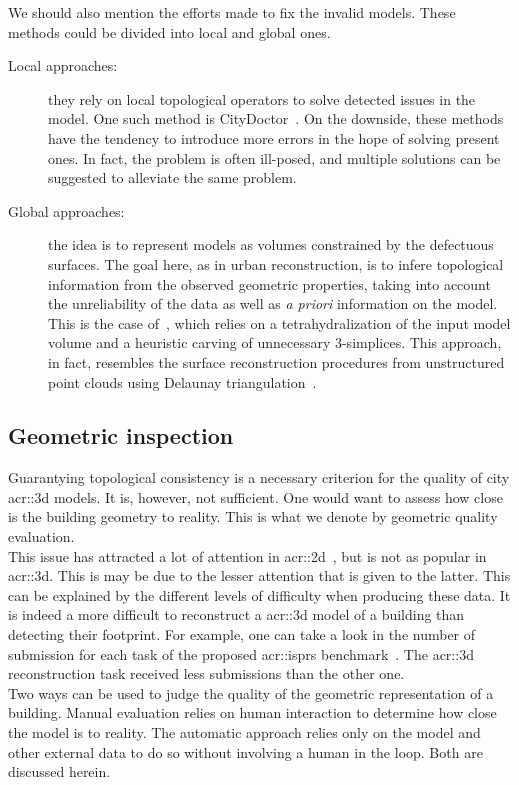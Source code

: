         We should also mention the efforts made to fix the invalid models. 
        These methods could be divided into local and global ones.
        \begin{description}
            \item[Local approaches:] they rely on local topological operators to solve detected issues in the model.
                    One such method is CityDoctor~\parencite{alam2014towards}.
                    On the downside, these methods have the tendency to introduce more errors in the hope of solving present ones.
                    In fact, the problem is often ill-posed, and multiple solutions can be suggested to alleviate the same problem.
            \item[Global approaches:] the idea is to represent models as volumes constrained by the defectuous surfaces.
                    The goal here, as in urban reconstruction, is to infere topological information from the observed geometric properties, taking into account the unreliability of the data as well as \textit{a priori} information on the model.
                    This is the case of~\textcite{zhao2013automatic}, which relies on a tetrahydralization of the input model volume and a heuristic carving of unnecessary 3-simplices.
                    This approach, in fact, resembles the surface reconstruction procedures from unstructured point clouds using Delaunay triangulation~\parencite{cazals2006delaunay, berger2014state}.
        \end{description}

    \subsection{Geometric inspection}
        \label{subsec::introduction::building_model_evaluation::geometric}
        Guarantying topological consistency is a necessary criterion for the quality of city \gls{acr::3d} models.
        It is, however, not sufficient.
        One would want to assess how close is the building geometry to reality.
        This is what we denote by geometric quality evaluation.\\
        This issue has attracted a lot of attention in \gls{acr::2d}~\parencite{mooney2010towards}, but is not as popular in \gls{acr::3d}.
        This is may be due to the lesser attention that is given to the latter.
        This can be explained by the different levels of difficulty when producing these data.
        It is indeed a more difficult to reconstruct a \gls{acr::3d} model of a building than detecting their footprint.
        For example, one can take a look in the number of submission for each task of the proposed \gls{acr::isprs} benchmark~\parencite{rottensteiner2012isprs, rottensteiner2014results}.
        The \gls{acr::3d} reconstruction task received less submissions than the other one.\\
        Two ways can be used to judge the quality of the geometric representation of a building.
        Manual evaluation relies on human interaction to determine how close the model is to reality.
        The automatic approach relies only on the model and other external data to do so without involving a human in the loop.
        Both are discussed herein.

